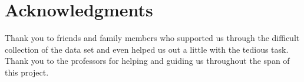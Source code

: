 \documentclass{article}
\begin{document}
\section*{Acknowledgments}

Thank you to friends and family members who supported us through the difficult collection of the data set and even helped us out a little with the tedious task. Thank you to the professors for helping and guiding us throughout the span of this project.

\nocite{EPA}
\nocite{cali}
\nocite{census}
\nocite{facilities}



\end{document}
